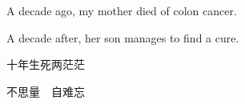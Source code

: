A decade ago, my mother died of colon cancer.

A decade after, her son manages to find a cure.

\hfill \break

十年生死两茫茫

不思量　自难忘
